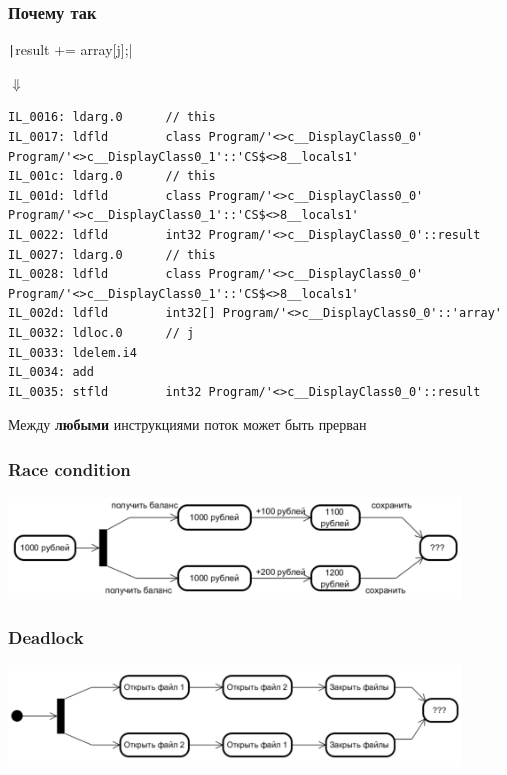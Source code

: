 \documentclass[xetex,mathserif,serif]{beamer}
\begin{document}
    \begin{frame}[fragile]
        \frametitle{Почему так}
        \texttt|result += array[j];|

        \hspace{13mm}$\Downarrow$

        \begin{ssmall}
            \begin{verbatim}
IL_0016: ldarg.0      // this
IL_0017: ldfld        class Program/'<>c__DisplayClass0_0' Program/'<>c__DisplayClass0_1'::'CS$<>8__locals1'
IL_001c: ldarg.0      // this
IL_001d: ldfld        class Program/'<>c__DisplayClass0_0' Program/'<>c__DisplayClass0_1'::'CS$<>8__locals1'
IL_0022: ldfld        int32 Program/'<>c__DisplayClass0_0'::result
IL_0027: ldarg.0      // this
IL_0028: ldfld        class Program/'<>c__DisplayClass0_0' Program/'<>c__DisplayClass0_1'::'CS$<>8__locals1'
IL_002d: ldfld        int32[] Program/'<>c__DisplayClass0_0'::'array'
IL_0032: ldloc.0      // j
IL_0033: ldelem.i4    
IL_0034: add          
IL_0035: stfld        int32 Program/'<>c__DisplayClass0_0'::result
            \end{verbatim}
        \end{ssmall}
        \vspace{5mm}
        Между \textbf{любыми} инструкциями поток может быть прерван
    \end{frame}

    \begin{frame}
        \frametitle{Race condition}
        \begin{center}
            \includegraphics[width=0.9\textwidth]{raceCondition.png}
        \end{center}
    \end{frame}

    \begin{frame}
        \frametitle{Deadlock}
        \begin{center}
            \includegraphics[width=0.9\textwidth]{deadlock.png}
        \end{center}
    \end{frame}
    
\end{document}
